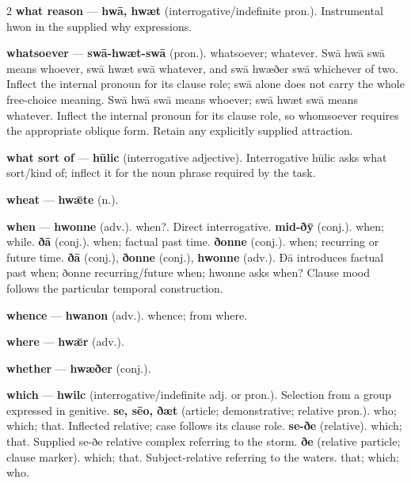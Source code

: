 \begin{multicols}{2}
\textbf{what reason} — \textbf{hwā, hwæt} (interrogative/indefinite pron.). Instrumental hwon in the supplied why expressions.\par
\textbf{whatsoever} — \textbf{swā-hwæt-swā} (pron.). whatsoever; whatever. Swā hwā swā means whoever, swā hwæt swā whatever, and swā hwæðer swā whichever of two. Inflect the internal pronoun for its clause role; swā alone does not carry the whole free-choice meaning. Swā hwā swā means whoever; swā hwæt swā means whatever. Inflect the internal pronoun for its clause role, so whomsoever requires the appropriate oblique form. Retain any explicitly supplied attraction.\par
\textbf{what sort of} — \textbf{hūlic} (interrogative adjective). Interrogative hūlic asks what sort/kind of; inflect it for the noun phrase required by the task.\par
\textbf{wheat} — \textbf{hwǣte} (n.).\par
\textbf{when} — \textbf{hwonne} (adv.). when?. Direct interrogative. \textbf{mid-ðȳ} (conj.). when; while. \textbf{ðā} (conj.). when; factual past time. \textbf{ðonne} (conj.). when; recurring or future time. \textbf{ðā} (conj.), \textbf{ðonne} (conj.), \textbf{hwonne} (adv.). Ðā introduces factual past when; ðonne recurring/future when; hwonne asks when? Clause mood follows the particular temporal construction.\par
\textbf{whence} — \textbf{hwanon} (adv.). whence; from where.\par
\textbf{where} — \textbf{hwǣr} (adv.).\par
\textbf{whether} — \textbf{hwæðer} (conj.).\par
\textbf{which} — \textbf{hwilc} (interrogative/indefinite adj. or pron.). Selection from a group expressed in genitive. \textbf{se, sēo, ðæt} (article; demonstrative; relative pron.). who; which; that. Inflected relative; case follows its clause role. \textbf{se-ðe} (relative). which; that. Supplied se-ðe relative complex referring to the storm. \textbf{ðe} (relative particle; clause marker). which; that. Subject-relative referring to the waters. that; which; who.\par

\end{multicols}
